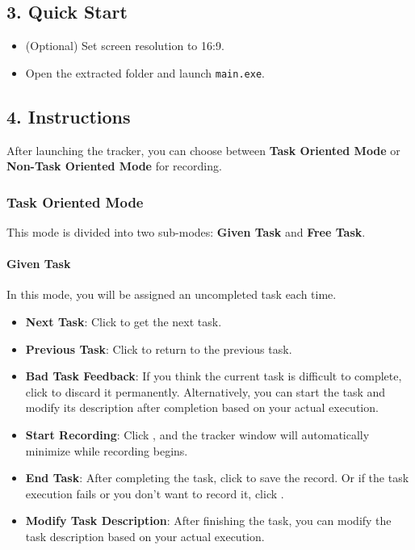 \documentclass{article} %
\begin{document}
\subsection*{3. Quick Start}
\begin{itemize}[itemsep=0pt]
    \item (Optional) Set screen resolution to 16:9.
    \item Open the extracted folder and launch \texttt{main.exe}.
\end{itemize}

\subsection*{4. Instructions}
After launching the tracker, you can choose between \textbf{Task Oriented Mode} or \textbf{Non-Task Oriented Mode} for recording.

\subsubsection*{Task Oriented Mode}
This mode is divided into two sub-modes: \textbf{Given Task} and \textbf{Free Task}.

\paragraph{Given Task}  
In this mode, you will be assigned an uncompleted task each time.
\begin{itemize}[itemsep=0pt]
    \item \textbf{Next Task}: Click  to get the next task.
    \item \textbf{Previous Task}: Click  to return to the previous task.
    \item \textbf{Bad Task Feedback}: If you think the current task is difficult to complete, click  to discard it permanently. Alternatively, you can start the task and modify its description after completion based on your actual execution.
    \item \textbf{Start Recording}: Click , and the tracker window will automatically minimize while recording begins.
    \item \textbf{End Task}: After completing the task, click  to save the record. Or if the task execution fails or you don't want to record it, click .
    \item \textbf{Modify Task Description}: After finishing the task, you can modify the task description based on your actual execution.
\end{itemize}
\end{document}
